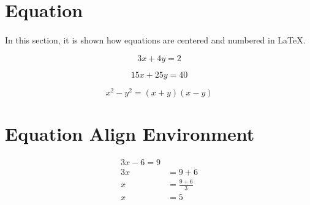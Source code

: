 \documentclass[12pt]{article}
\begin{document}
	\section{Equation}
	
	\paragraph{}
	
	In this section, it is shown how equations are centered and numbered in LaTeX.
	
	\begin{equation}
		3x + 4y = 2
	\end{equation}
	
	\begin{equation}
		15x + 25y = 40
	\end{equation}
	
	\begin{equation}
		x^{2} - y^{2} = (x+y)(x-y)
	\end{equation}
	
	\section{Equation Align Environment}
	
	\begin{align}
		3x - 6 = 9  \\
		3x& = 9 + 6 \nonumber \\
		x& = \frac{9+6}{3} \nonumber \\
		x& = 5 \nonumber
	\end{align}
	
\end{document}
